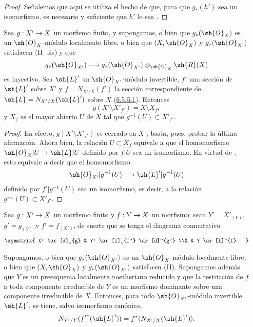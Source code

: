 \documentclass[oneside,10pt]{amsart}
\makeatletter
\newcommand{\ega@arrow}[2]{\mathchoice{#1}{#2}{#2}{#2}}
\renewcommand{\to}{\ega@arrow{\longrightarrow}{\rightarrow}}
\newcommand{\oldpage}[2][]{\marginnote{\normalfont\footnotesize\textbf{#1}~|~#2}\ignorespaces}
\let\EGAOriginalLabel\label
\renewcommand{\label}[1]{\phantomsection\EGAOriginalLabel{#1}}
\makeatother
\begin{document}
\begin{proof}
Señalemos que aquí se utiliza el hecho de que, para que $g_*(h')$ sea un isomorfismo, es necesario y suficiente que $h'$ lo sea .
\end{proof}

\begin{corollary}[6.5.7]
\label{II.6.5.7}
Sea $g:X'\to X$ un morfismo finito, y supongamos, o bien que $g_*(\sh{O}_X)$ es un $\sh{O}_X$-módulo localmente libre, o bien que $(X,\sh{O}_X)$ y $g_*(\sh{O}_{X'})$ satisfacen \textup{(II~bis)} y que
\[
  g_*(\sh{O}_{X'})\to
  g_*(\sh{O}_{X'})\otimes_{\sh{O}_X}\sh{R}(X)
\]
es inyectivo.
Sea $\sh{L}'$ un $\sh{O}_{X'}$-módulo invertible, $f'$ una sección de $\sh{L}'$ sobre $X'$ y $f=N_{X'/X}(f')$ la sección correspondiente de $\sh{L}=N_{X'/X}(\sh{L}')$ sobre $X$ \textup{(\hyperref[II.6.5.5.3]{6.5.5.1})}.
\oldpage[II]{130}
Entonces
\[
  g(X'\setminus X'_{f'})=X\setminus X_f,
\]
y $X_f$ es el mayor abierto $U$ de $X$ tal que $g^{-1}(U)\subset X'_{f'}$.
\end{corollary}

\begin{proof}
En efecto, $g(X'\setminus X'_{f'})$ es cerrado en $X$ ;
basta, pues, probar la última afirmación.
Ahora bien, la relación $U\subset X_f$ equivale a que el homomorfismo $\sh{O}_X|U\to\sh{L}|U$ definido por $f|U$ sea un isomorfismo.
En virtud de , esto equivale a decir que el homomorfismo
\[
  \sh{O}_{X'}|g^{-1}(U)\to\sh{L}'|g^{-1}(U)
\]
definido por $f'|g^{-1}(U)$ sea un isomorfismo, es decir, a la relación $g^{-1}(U)\subset X'_{f'}$.
\end{proof}


\begin{proposition}[6.5.8]
\label{II.6.5.8}
Sea $g:X'\to X$ un morfismo finito y $f:Y\to X$ un morfismo;
sean $Y'=X'_{(Y)}$, $g'=g_{(Y)}$ y $f'=f_{(X')}$, de suerte que se tenga el diagrama conmutativo
\[
  \xymatrix{
    X' \ar[d]_{g}
    & Y' \ar[l]_{f'} \ar[d]^{g'}
  \\X
    & Y \ar[l]^{f}.
  }
\]

Supongamos, o bien que $g_*(\sh{O}_{X'})$ es un $\sh{O}_X$-módulo localmente libre, o bien que $(X,\sh{O}_X)$ y $g_*(\sh{O}_{X'})$ satisfacen \textup{(II)}.
Supongamos además que $Y$ es un preesquema localmente noetheriano reducido y que la restricción de $f$ a toda componente irreducible de $Y$ es un morfismo dominante sobre una componente irreducible de $X$.
Entonces, para todo $\sh{O}_{X'}$-módulo invertible $\sh{L}'$, se tiene, salvo isomorfismo canónico,
\[
  N_{Y'/Y}({f'}^*(\sh{L}'))=
  f^*(N_{X'/X}(\sh{L}')).
\]
\end{proposition}
\end{document}
